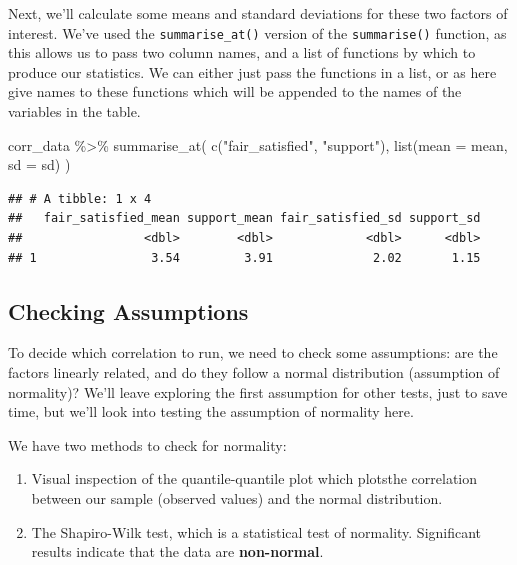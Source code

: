 \documentclass[
]{book}
\newenvironment{Shaded}{\begin{snugshade}}{\end{snugshade}}
\newcommand{\AttributeTok}[1]{\textcolor[rgb]{0.77,0.63,0.00}{#1}}
\newcommand{\FunctionTok}[1]{\textcolor[rgb]{0.00,0.00,0.00}{#1}}
\newcommand{\NormalTok}[1]{#1}
\newcommand{\SpecialCharTok}[1]{\textcolor[rgb]{0.00,0.00,0.00}{#1}}
\newcommand{\StringTok}[1]{\textcolor[rgb]{0.31,0.60,0.02}{#1}}
\providecommand{\tightlist}{%
  \setlength{\itemsep}{0pt}\setlength{\parskip}{0pt}}
\begin{document}
Next, we'll calculate some means and standard deviations for these two factors of interest. We've used the \texttt{summarise\_at()} version of the \texttt{summarise()} function, as this allows us to pass two column names, and a list of functions by which to produce our statistics. We can either just pass the functions in a list, or as here give names to these functions which will be appended to the names of the variables in the table.

\begin{Shaded}
\begin{Highlighting}[]
\NormalTok{corr\_data }\SpecialCharTok{\%\textgreater{}\%} \FunctionTok{summarise\_at}\NormalTok{(}
  \FunctionTok{c}\NormalTok{(}\StringTok{"fair\_satisfied"}\NormalTok{, }\StringTok{"support"}\NormalTok{), }
  \FunctionTok{list}\NormalTok{(}\AttributeTok{mean =}\NormalTok{ mean, }\AttributeTok{sd =}\NormalTok{ sd)}
\NormalTok{)}
\end{Highlighting}
\end{Shaded}

\begin{verbatim}
## # A tibble: 1 x 4
##   fair_satisfied_mean support_mean fair_satisfied_sd support_sd
##                 <dbl>        <dbl>             <dbl>      <dbl>
## 1                3.54         3.91              2.02       1.15
\end{verbatim}

\hypertarget{checking-assumptions}{%
\subsection{Checking Assumptions}\label{checking-assumptions}}

To decide which correlation to run, we need to check some assumptions: are the factors linearly related, and do they follow a normal distribution (assumption of normality)? We'll leave exploring the first assumption for other tests, just to save time, but we'll look into testing the assumption of normality here.

We have two methods to check for normality:

\begin{enumerate}
\def\labelenumi{\arabic{enumi}.}
\tightlist
\item
  Visual inspection of the quantile-quantile plot which plotsthe correlation between our sample (observed values) and the normal distribution.
\item
  The Shapiro-Wilk test, which is a statistical test of normality. Significant results indicate that the data are \textbf{non-normal}.
\end{enumerate}
\end{document}
